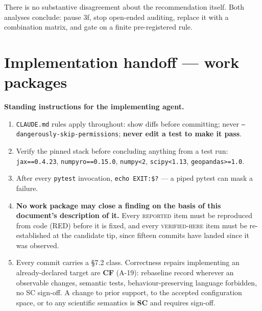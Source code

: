 \documentclass[11pt]{article}
\newcommand{\vfy}{\textsc{verified-here}}
\newcommand{\rep}{\textsc{reported}}
\renewcommand{\tt}[1]{\texttt{#1}}
\newenvironment{ruling}{\begin{leftbar}\small}{\end{leftbar}}
\begin{document}
\noindent There is no substantive disagreement about the recommendation itself. Both
analyses conclude: pause 3f, stop open-ended auditing, replace it with a combination
matrix, and gate on a finite pre-registered rule.

\section{Implementation handoff --- work packages}

\begin{ruling}
\noindent\textbf{Standing instructions for the implementing agent.}
\begin{enumerate}[leftmargin=1.6em]
  \item \tt{CLAUDE.md} rules apply throughout: show diffs before committing; never
  \tt{--dangerously-skip-permissions}; \textbf{never edit a test to make it pass}.
  \item Verify the pinned stack before concluding anything from a test run:
  \tt{jax==0.4.23}, \tt{numpyro==0.15.0}, \tt{numpy<2}, \tt{scipy<1.13},
  \tt{geopandas>=1.0}.
  \item After every \tt{pytest} invocation, \tt{echo EXIT:\$?} --- a piped pytest can mask
  a failure.
  \item \textbf{No work package may close a finding on the basis of this document's
  description of it.} Every \rep{} item must be reproduced from code (RED) before it is
  fixed, and every \vfy{} item must be re-established at the candidate tip, since fifteen
  commits have landed since it was observed.
  \item Every commit carries a \S7.2 class. Correctness repairs implementing an
  already-declared target are \textbf{CF} (A-19): rebaseline record wherever an observable
  changes, semantic tests, behaviour-preserving language forbidden, no SC sign-off. A
  change to prior support, to the accepted configuration space, or to any scientific
  semantics is \textbf{SC} and requires sign-off.
\end{enumerate}
\end{ruling}
\end{document}

